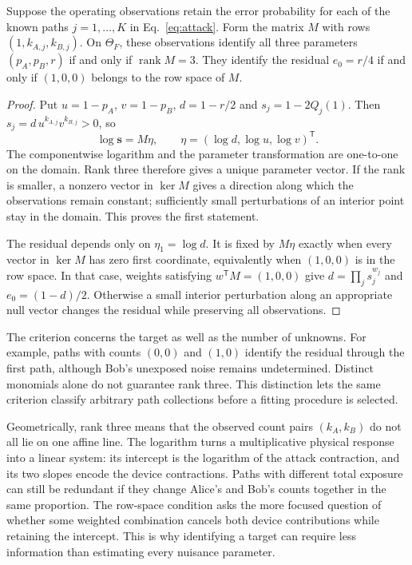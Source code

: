 \documentclass[manuscript,screen,review,anonymous]{acmart}
\begin{document}
\begin{proposition}
\label{prop:identification}
Suppose the operating observations retain the error probability for each of
the known paths $j=1,\ldots,K$ in Eq.~\eqref{eq:attack}.
Form the matrix $M$ with rows $(1,k_{A,j},k_{B,j})$.
On $\Theta_F$, these observations identify all three parameters
$(p_A,p_B,r)$ if and only if $\operatorname{rank}M=3$.
They identify the residual $e_0=r/4$ if and only if
$(1,0,0)$ belongs to the row space of $M$.
\end{proposition}
\begin{proof}
Put $u=1-p_A$, $v=1-p_B$, $d=1-r/2$ and $s_j=1-2Q_j(1)$.
Then $s_j=d\,u^{k_{A,j}}v^{k_{B,j}}>0$, so
\[
 \log\mathbf s=M\eta,\qquad
 \eta=(\log d,\log u,\log v)^{\mathsf T}.
\]
The componentwise logarithm and the parameter transformation are one-to-one
on the domain. Rank three therefore gives a unique parameter vector.
If the rank is smaller, a nonzero vector in $\ker M$ gives a direction along
which the observations remain constant; sufficiently small perturbations of
an interior point stay in the domain. This proves the first statement.

The residual depends only on $\eta_1=\log d$. It is fixed by $M\eta$
exactly when every vector in $\ker M$ has zero first coordinate, equivalently
when $(1,0,0)$ is in the row space. In that case, weights satisfying
$w^{\mathsf T}M=(1,0,0)$ give $d=\prod_j s_j^{w_j}$ and
$e_0=(1-d)/2$. Otherwise a small interior perturbation along an appropriate
null vector changes the residual while preserving all observations.
\end{proof}

The criterion concerns the target as well as the number of unknowns.
For example, paths with counts $(0,0)$ and $(1,0)$ identify the residual
through the first path, although Bob's unexposed noise remains undetermined.
Distinct monomials alone do not guarantee rank three. This distinction lets
the same criterion classify arbitrary path collections before a fitting
procedure is selected.

Geometrically, rank three means that the observed count pairs
$(k_A,k_B)$ do not all lie on one affine line. The logarithm turns a
multiplicative physical response into a linear system: its intercept is the
logarithm of the attack contraction, and its two slopes encode the device contractions.
Paths with different total exposure can still be redundant if they change
Alice's and Bob's counts together in the same proportion. The row-space
condition asks the more focused question of whether some weighted combination
cancels both device contributions while retaining the intercept.
This is why identifying a target can require less information than estimating
every nuisance parameter.
\end{document}
